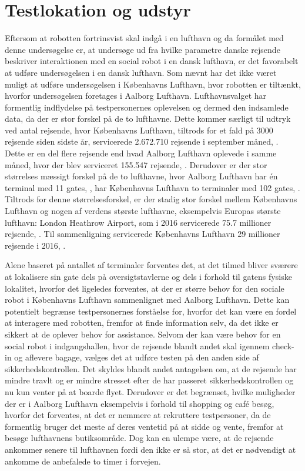 \section{Testlokation og udstyr}
\label{ParametreTestlokationOgUdstyr}
%
Eftersom at robotten fortrinsvist skal indgå i en lufthavn og da formålet med denne undersøgelse er, at undersøge ud fra hvilke parametre danske rejsende beskriver interaktionen med en social robot i en dansk lufthavn, er det favorabelt at udføre undersøgelsen i en dansk lufthavn. Som nævnt har det ikke været muligt at udføre undersøgelsen i Københavns Lufthavn, hvor robotten er tiltænkt, hvorfor undersøgelsen foretages i Aalborg Lufthavn. Lufthavnsvalget har formentlig indflydelse på testpersonernes oplevelsen og dermed den indsamlede data, da der er stor forskel på de to lufthavne. Dette kommer særligt til udtryk ved antal rejsende, hvor Københavns Lufthavn, tiltrods for et fald på 3000 rejsende siden sidste år, servicerede 2.672.710 rejsende i september måned, \parencite{WEB:CPHStatistisk}. Dette er en del flere rejsende end hvad Aalborg Lufthavn oplevede i samme måned, hvor der blev serviceret 155.547 rejsende, \parencite{WEB:AALStatistik}. Derudover er der stor størrelses mæssigt forskel på de to lufthavne, hvor Aalborg Lufthavn har én terminal med 11 gates, \parencite{WEB:AALTerminalOversigt}, har Københavns Lufthavn to terminaler med 102 gates, \parencite{WEB:CPHTerminalOversigt}. Tiltrods for denne størrelsesforskel, er der stadig stor forskel mellem Københavns Lufthavn og nogen af verdens største lufthavne, eksempelvis Europas største lufthavn: London Heathrow Airport, som i 2016 servicerede 75.7 millioner rejsende, \parencite{WEB:HeathrowStatistisk}. Til sammenligning servicerede Københavns Lufthavn 29 millioner rejsende i 2016, \parencite{WEB:CPHStatistiskYear}.

Alene baseret på antallet af terminaler forventes det, at det tilmed bliver sværere at lokalisere sin gate dels på oversigtstavlerne og dels i forhold til gatens fysiske lokalitet, hvorfor det ligeledes forventes, at der er større behov for den sociale robot i Københavns Lufthavn sammenlignet med Aalborg Lufthavn. Dette kan potentielt begrænse testpersonernes forståelse for, hvorfor det kan være en fordel at interagere med robotten, fremfor at finde information selv, da det ikke er sikkert at de oplever behov for assistance.\blankline
%
Selvom der kan være behov for en social robot i indgangshallen, hvor de rejsende blandt andet skal igennem check-in og aflevere bagage, vælges det at udføre testen på den anden side af sikkerhedskontrollen. Det skyldes blandt andet antagelsen om, at de rejsende har mindre travlt og er mindre stresset efter de har passeret sikkerhedskontrollen og nu kun venter på at boarde flyet. Derudover er det begrænset, hvilke muligheder der er i Aalborg Lufthavn eksempelvis i forhold til shopping og café besøg, hvorfor det forventes, at det er nemmere at rekruttere testpersoner, da de formentlig bruger det meste af deres ventetid på at sidde og vente, fremfor at besøge lufthavnens butiksområde. Dog kan en ulempe være, at de rejsende ankommer senere til lufthavnen fordi den ikke er så stor, at det er nødvendigt at ankomme de anbefalede to timer i forvejen.

